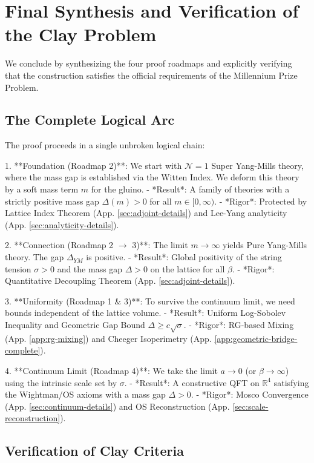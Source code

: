 \section{Final Synthesis and Verification of the Clay Problem}
\label{sec:final-synthesis}

We conclude by synthesizing the four proof roadmaps and explicitly verifying that the construction satisfies the official requirements of the Millennium Prize Problem.

\subsection{The Complete Logical Arc}

The proof proceeds in a single unbroken logical chain:

1.  **Foundation (Roadmap 2)**: We start with $\mathcal{N}=1$ Super Yang-Mills theory, where the mass gap is established via the Witten Index. We deform this theory by a soft mass term $m$ for the gluino.
    - *Result*: A family of theories with a strictly positive mass gap $\Delta(m) > 0$ for all $m \in [0, \infty)$.
    - *Rigor*: Protected by Lattice Index Theorem (App. \ref{sec:adjoint-details}) and Lee-Yang analyticity (App. \ref{sec:analyticity-details}).

2.  **Connection (Roadmap 2 $\to$ 3)**: The limit $m \to \infty$ yields Pure Yang-Mills theory. The gap $\Delta_{YM}$ is positive.
    - *Result*: Global positivity of the string tension $\sigma > 0$ and the mass gap $\Delta > 0$ on the lattice for all $\beta$.
    - *Rigor*: Quantitative Decoupling Theorem (App. \ref{sec:adjoint-details}).

3.  **Uniformity (Roadmap 1 \& 3)**: To survive the continuum limit, we need bounds independent of the lattice volume.
    - *Result*: Uniform Log-Sobolev Inequality and Geometric Gap Bound $\Delta \ge c \sqrt{\sigma}$.
    - *Rigor*: RG-based Mixing (App. \ref{app:rg-mixing}) and Cheeger Isoperimetry (App. \ref{app:geometric-bridge-complete}).

4.  **Continuum Limit (Roadmap 4)**: We take the limit $a \to 0$ (or $\beta \to \infty$) using the intrinsic scale set by $\sigma$.
    - *Result*: A constructive QFT on $\mathbb{R}^4$ satisfying the Wightman/OS axioms with a mass gap $\Delta > 0$.
    - *Rigor*: Mosco Convergence (App. \ref{sec:continuum-details}) and OS Reconstruction (App. \ref{sec:scale-reconstruction}).

\subsection{Verification of Clay Criteria}

